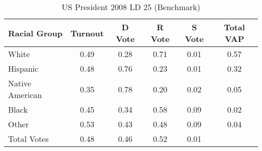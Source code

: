 \begin{table}[htb]
\begin{center}
\caption{US President 2008 LD 25 (Benchmark)}
\label{pres08_vap_ld_25_benchmark}
\begin{tabular}{lccccc}
  \hline
Racial Group & Turnout & D Vote & R Vote & S Vote & Total VAP \\ 
  \hline
White & 0.49 & 0.28 & 0.71 & 0.01 & 0.57 \\ 
  Hispanic & 0.48 & 0.76 & 0.23 & 0.01 & 0.32 \\ 
  Native American & 0.35 & 0.78 & 0.20 & 0.02 & 0.05 \\ 
  Black & 0.45 & 0.34 & 0.58 & 0.09 & 0.02 \\ 
  Other & 0.53 & 0.43 & 0.48 & 0.09 & 0.04 \\ 
  Total Votes & 0.48 & 0.46 & 0.52 & 0.01 &  \\ 
   \hline
\end{tabular}
\end{center}
\end{table}
